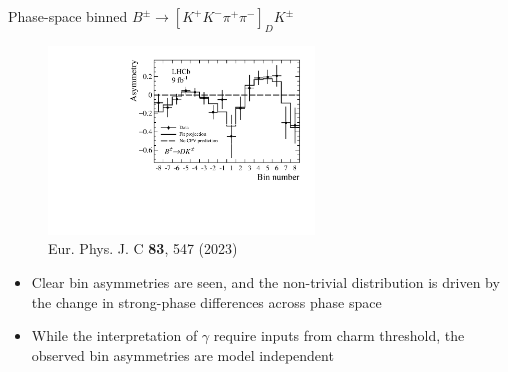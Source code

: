 \documentclass[dvipsnames]{beamer}
\begin{document}
\begin{frame}{Phase-space binned $B^\pm\to[K^+K^-\pi^+\pi^-]_DK^\pm$}
  \begin{figure}
    \includegraphics[height = 5cm]{Plots/BinAsymmetries_dk.pdf}
    \vspace{-0.4cm}
    \caption*{\tiny Eur. Phys. J. C \textbf{83}, 547 (2023)}
  \end{figure}
  \vspace{-0.5cm}
  \begin{itemize}
    \setlength\itemsep{0.5em}
    \item{Clear bin asymmetries are seen, and the non-trivial distribution is driven by the change in strong-phase differences across phase space}
    \item{While the interpretation of $\gamma$ require inputs from charm threshold, the observed bin asymmetries are model independent}
  \end{itemize}
\end{frame}
\end{document}

